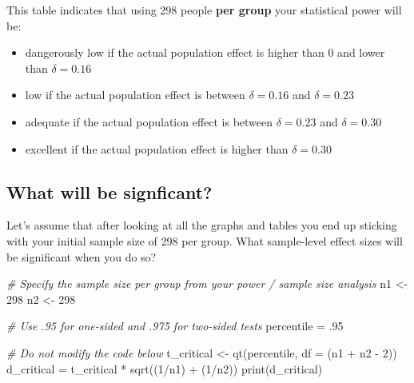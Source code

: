 \documentclass[
]{krantz}
\makeatletter
\newenvironment{Shaded}{\begin{snugshade}}{\end{snugshade}}
\newcommand{\AttributeTok}[1]{\textcolor[rgb]{0.61,0.61,0.61}{#1}}
\newcommand{\CommentTok}[1]{\textcolor[rgb]{0.37,0.37,0.37}{\textit{#1}}}
\newcommand{\DecValTok}[1]{\textcolor[rgb]{0.06,0.06,0.06}{#1}}
\newcommand{\FunctionTok}[1]{\textcolor[rgb]{0,0,0}{#1}}
\newcommand{\NormalTok}[1]{#1}
\newcommand{\OtherTok}[1]{\textcolor[rgb]{0.37,0.37,0.37}{#1}}
\newcommand{\SpecialCharTok}[1]{\textcolor[rgb]{0,0,0}{#1}}
\newenvironment{kframe}{%
\medskip{}
\setlength{\fboxsep}{.8em}
 \def\at@end@of@kframe{}%
 \ifinner\ifhmode%
  \def\at@end@of@kframe{\end{minipage}}%
  \begin{minipage}{\columnwidth}%
 \fi\fi%
 \def\FrameCommand##1{\hskip\@totalleftmargin \hskip-\fboxsep
 \colorbox{shadecolor}{##1}\hskip-\fboxsep
     \hskip-\linewidth \hskip-\@totalleftmargin \hskip\columnwidth}%
 \MakeFramed {\advance\hsize-\width
   \@totalleftmargin\z@ \linewidth\hsize
   \@setminipage}}%
 {\par\unskip\endMakeFramed%
 \at@end@of@kframe}
\renewenvironment{Shaded}{\begin{kframe}}{\end{kframe}}
\makeatother
\begin{document}
This table indicates that using 298 people \textbf{per group} your statistical power will be:

\begin{itemize}
\item
  dangerously low if the actual population effect is higher than 0 and lower than \(\delta = 0.16\)
\item
  low if the actual population effect is between \(\delta = 0.16\) and \(\delta = 0.23\)
\item
  adequate if the actual population effect is between \(\delta = 0.23\) and \(\delta = 0.30\)
\item
  excellent if the actual population effect is higher than \(\delta = 0.30\)
\end{itemize}

\hypertarget{what-will-be-signficant}{%
\subsection{What will be signficant?}\label{what-will-be-signficant}}

Let's assume that after looking at all the graphs and tables you end up sticking with your initial sample size of 298 per group. What sample-level effect sizes will be significant when you do so?

\begin{Shaded}
\begin{Highlighting}[]
\CommentTok{\# Specify the sample size per group from your power / sample size analysis}
\NormalTok{n1 }\OtherTok{\textless{}{-}} \DecValTok{298}
\NormalTok{n2 }\OtherTok{\textless{}{-}} \DecValTok{298}

\CommentTok{\# Use .95 for one{-}sided and .975 for two{-}sided tests}
\NormalTok{percentile }\OtherTok{=}\NormalTok{ .}\DecValTok{95} 

\CommentTok{\# Do not modify the code below}
\NormalTok{t\_critical }\OtherTok{\textless{}{-}} \FunctionTok{qt}\NormalTok{(percentile, }\AttributeTok{df =}\NormalTok{ (n1 }\SpecialCharTok{+}\NormalTok{ n2 }\SpecialCharTok{{-}} \DecValTok{2}\NormalTok{))}
\NormalTok{d\_critical }\OtherTok{=}\NormalTok{ t\_critical }\SpecialCharTok{*} \FunctionTok{sqrt}\NormalTok{((}\DecValTok{1}\SpecialCharTok{/}\NormalTok{n1) }\SpecialCharTok{+}\NormalTok{ (}\DecValTok{1}\SpecialCharTok{/}\NormalTok{n2))}
\FunctionTok{print}\NormalTok{(d\_critical)}
\end{Highlighting}
\end{Shaded}
\end{document}
